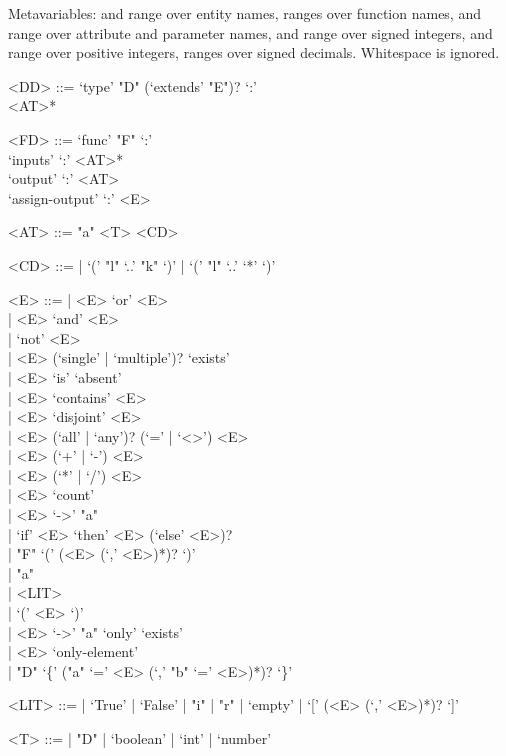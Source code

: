 Metavariables:  and  range over entity names,  ranges over function names,  and  range over attribute and parameter names,  and  range over signed integers,  and  range over positive integers,  ranges over signed decimals. Whitespace is ignored.

\begin{defbox}[2]
\begin{grammar}
<DD> ::= 
  `type' "D" (`extends' "E")? `:'\\
\ind <AT>*

<FD> ::= 
  `func' "F" `:'\\
\ind `inputs' `:' <AT>*\\
\ind `output' `:' <AT>\\
\ind `assign-output' `:' <E>

<AT> ::= 
  "a" <T> <CD>

<CD> ::= 
  | `(' "l" `..' "k" `)' 
  | `(' "l" `..' `*' `)' 

<E> ::= 
  | <E> `or' <E>\\
  | <E> `and' <E>\\
  | `not' <E>\\
  | <E> (`single' | `multiple')? `exists'\\
  | <E> `is' `absent'\\
  | <E> `contains' <E>\\
  | <E> `disjoint' <E>\\
  | <E> (`all' | `any')? (`=' | `<>') <E>\\
  | <E> (`+' | `-') <E>\\
  | <E> (`*' | `/') <E>\\
  | <E> `count'\\
  | <E> `->' "a"\\
  | `if' <E> `then' <E> (`else' <E>)?\\
  | "F" `(' (<E> (`,' <E>)*)? `)'\\
  | "a"\\
  | <LIT>\\
  | `(' <E> `)'\\
  | <E> `->' "a" `only' `exists'\\
  | <E> `only-element'\\
  | "D" `\{' ("a" `=' <E> (`,' "b" `=' <E>)*)? `\}'

<LIT> ::= 
  | `True' | `False' 
  | "i" 
  | "r" 
  | `empty' 
  | `[' (<E> (`,' <E>)*)? `]' 

<T> ::= 
  | "D"
  | `boolean'
  | `int'
  | `number'
\end{grammar}
\end{defbox}

